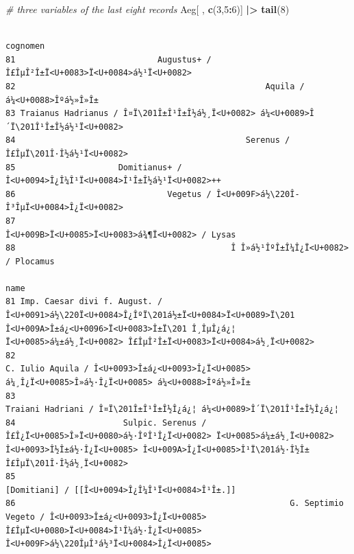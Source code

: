 \documentclass[a4paper,11pt]{memoir}
\newenvironment{Shaded}{\begin{snugshade}}{\end{snugshade}}
\newcommand{\CommentTok}[1]{\textcolor[rgb]{0.56,0.35,0.01}{\textit{#1}}}
\newcommand{\DecValTok}[1]{\textcolor[rgb]{0.00,0.00,0.81}{#1}}
\newcommand{\ErrorTok}[1]{\textcolor[rgb]{0.64,0.00,0.00}{\textbf{#1}}}
\newcommand{\KeywordTok}[1]{\textcolor[rgb]{0.13,0.29,0.53}{\textbf{#1}}}
\newcommand{\NormalTok}[1]{#1}
\newcommand{\OperatorTok}[1]{\textcolor[rgb]{0.81,0.36,0.00}{\textbf{#1}}}
\newcommand{\StringTok}[1]{\textcolor[rgb]{0.31,0.60,0.02}{#1}}
\begin{document}
\begin{Shaded}
\begin{Highlighting}[]
\CommentTok{# three variables of the last eight records}
\NormalTok{Aeg[ , }\KeywordTok{c}\NormalTok{(}\DecValTok{3}\NormalTok{,}\DecValTok{5}\OperatorTok{:}\DecValTok{6}\NormalTok{)] }\OperatorTok{|}\ErrorTok{>}\StringTok{ }
\StringTok{  }\KeywordTok{tail}\NormalTok{(}\DecValTok{8}\NormalTok{)}
\end{Highlighting}
\end{Shaded}

\begin{verbatim}
                                                                         cognomen
81                             Augustus+ / Î£ÎµÎ²Î±Ï<U+0083>Ï<U+0084>á½¹Ï<U+0082>
82                                                   Aquila / á¼<U+0088>Îºá½»Î»Î±
83 Traianus Hadrianus / Î¤Ï\201Î±Î¹Î±Î½á½¸Ï<U+0082> á¼<U+0089>Î´Ï\201Î¹Î±Î½á½¹Ï<U+0082>
84                                               Serenus / Î£ÎµÏ\201Î·Î½á½¹Ï<U+0082>
85                     Domitianus+ / Î<U+0094>Î¿Î¼Î¹Ï<U+0084>Î¹Î±Î½á½¹Ï<U+0082>++
86                               Vegetus / Î<U+009F>á½\220Î­Î³ÎµÏ<U+0084>Î¿Ï<U+0082>
87                                Î<U+009B>Ï<U+0085>Ï<U+0083>á¾¶Ï<U+0082> / Lysas
88                                            Î Î»á½¹ÎºÎ±Î¼Î¿Ï<U+0082> / Plocamus
                                                                                                                                                                                            name
81 Imp. Caesar divi f. August. / Î<U+0091>á½\220Ï<U+0084>Î¿ÎºÏ\201á½±Ï<U+0084>Ï<U+0089>Ï\201 Î<U+009A>Î±á¿<U+0096>Ï<U+0083>Î±Ï\201 Î¸ÎµÎ¿á¿¦ Ï<U+0085>á¼±á½¸Ï<U+0082> Î£ÎµÎ²Î±Ï<U+0083>Ï<U+0084>á½¸Ï<U+0082>
82                                                                                         C. Iulio Aquila / Î<U+0093>Î±á¿<U+0093>Î¿Ï<U+0085> á¼¸Î¿Ï<U+0085>Î»á½·Î¿Ï<U+0085> á¼<U+0088>Îºá½»Î»Î±
83                                                                                                                                Traiani Hadriani / Î¤Ï\201Î±Î¹Î±Î½Î¿á¿¦ á¼<U+0089>Î´Ï\201Î¹Î±Î½Î¿á¿¦
84                      Sulpic. Serenus / Î£Î¿Ï<U+0085>Î»Ï<U+0080>á½·ÎºÎ¹Î¿Ï<U+0082> Ï<U+0085>á¼±á½¸Ï<U+0082> Î<U+0093>Î½Î±á½·Î¿Ï<U+0085> Î<U+009A>Î¿Ï<U+0085>Î¹Ï\201á½·Î½Î± Î£ÎµÏ\201Î·Î½á½¸Ï<U+0082>
85                                                                                                                                               [Domitiani] / [[Î<U+0094>Î¿Î¼Î¹Ï<U+0084>Î¹Î±.]]
86                                                        G. Septimio Vegeto / Î<U+0093>Î±á¿<U+0093>Î¿Ï<U+0085> Î£ÎµÏ<U+0080>Ï<U+0084>Î¹Î¼á½·Î¿Ï<U+0085> Î<U+009F>á½\220ÎµÎ³á½³Ï<U+0084>Î¿Ï<U+0085>

\end{verbatim}
\end{document}
